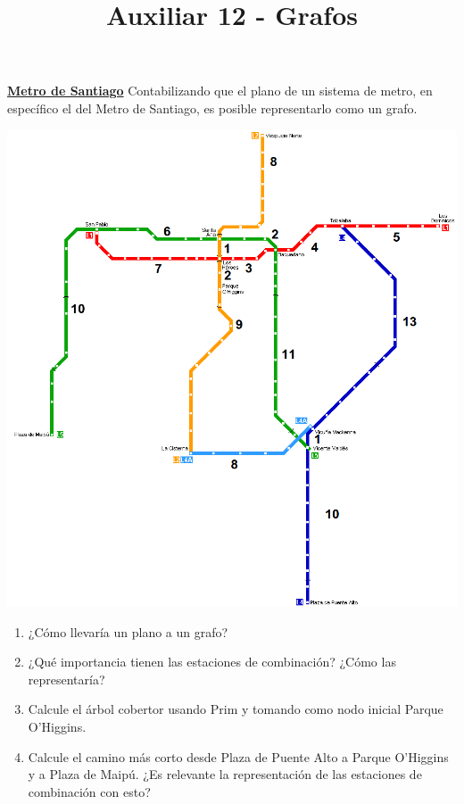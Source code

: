 \documentclass[dcc,uchile]{fcfmcourse}
\title{Auxiliar 12 - Grafos}
\newcommand{\ptitle}[1]{\underline{\textbf{#1}}}
\begin{document}
\maketitle

\vspace{-1ex}


\begin{problems}


\problem \ptitle{Metro de Santiago}
Contabilizando que el plano de un sistema de metro, en específico el del Metro de Santiago, es posible representarlo como un grafo.
\begin{center}
    \includegraphics[scale=0.25]{imagenes/metro.png}
\end{center} 
\begin{enumerate}[1)]
    \item ¿Cómo llevaría un plano a un grafo?
    \item ¿Qué importancia tienen las estaciones de combinación? ¿Cómo las representaría?
    \item Calcule el árbol cobertor usando Prim y tomando como nodo inicial Parque O'Higgins.
    \item Calcule el camino más corto desde Plaza de Puente Alto a Parque O'Higgins y a Plaza de Maipú. ¿Es relevante la representación de las estaciones de combinación con esto?

\end{enumerate}
\end{problems}
\end{document}
